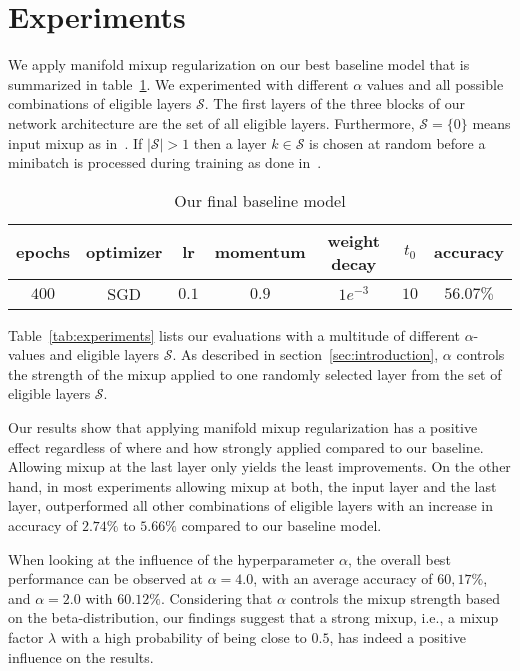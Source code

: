 \section{Experiments}
\label{sec:experiments}

We apply manifold mixup regularization on our best baseline model that is summarized in table~\ref{tab:baseline}.
We experimented with different $\alpha$ values and all possible combinations of eligible layers $\mathcal{S}$. 
The first layers of the three blocks of our network architecture are the set of all eligible layers.
Furthermore, $\mathcal{S} = \{0\}$ means input mixup as in~\cite{zhang17}.
If $|\mathcal{S}| > 1$ then a layer $k \in \mathcal{S}$ is chosen at random before a minibatch is processed during training as done in~\cite{verma19}.

\begin{table}[H]
    \centering
    \begin{tabular}{ccccccc}
        \toprule
        epochs & optimizer & lr & momentum & weight decay & $t_0$ & accuracy \\
        \midrule
        $400$ & SGD & $0.1$ & $0.9$ & $1e^{-3}$ & $10$ & $56.07\%$ \\
        \bottomrule
    \end{tabular}
    \caption{Our final baseline model}
    \label{tab:baseline}
\end{table}

Table~\ref{tab:experiments} lists our evaluations with a multitude of different $\alpha$-values and eligible layers $\mathcal{S}$. As described in section~\ref{sec:introduction}, $\alpha$ controls the strength of the mixup applied to one randomly selected layer from the set of eligible layers $\mathcal{S}$.

Our results show that applying manifold mixup regularization has a positive effect regardless of where and how strongly applied compared to our baseline. Allowing mixup at the last layer only yields the least improvements. On the other hand, in most experiments allowing mixup at both, the input layer and the last layer, outperformed all other combinations of eligible layers with an increase in accuracy of $2.74\%$ to $5.66\%$ compared to our baseline model.

When looking at the influence of the hyperparameter $\alpha$, the overall best performance  can be observed at $\alpha=4.0$, with an average accuracy of $60,17\%$, and $\alpha=2.0$ with $60.12\%$. Considering that $\alpha$ controls the mixup strength based on the beta-distribution, our findings suggest that a strong mixup, i.e., a mixup factor $\lambda$ with a high probability of being close to $0.5$, has indeed a positive influence on the results.

